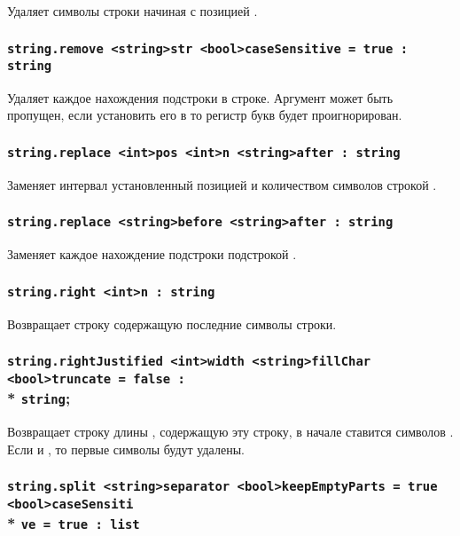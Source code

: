 Удаляет  символы строки начиная с позицией .

\subsubsection{\lstinline|string.remove <string>str <bool>caseSensitive = true : string|}

Удаляет каждое нахождения подстроки  в строке. Аргумент  может быть пропущен, если установить его в \false{} то регистр букв будет проигнорирован.

\subsubsection{\lstinline|string.replace <int>pos <int>n <string>after : string|}

Заменяет интервал установленный позицией  и количеством символов  строкой .

\subsubsection{\lstinline|string.replace <string>before <string>after : string|}

Заменяет каждое нахождение подстроки  подстрокой .

\subsubsection{\lstinline|string.right <int>n : string|}

Возвращает строку содержащую последние  символы строки.

\subsubsection{\lstinline|string.rightJustified <int>width <string>fillChar <bool>truncate = false :|\\* \lstinline|string|;}

Возвращает строку длины , содержащую эту строку, в начале ставится  символов . Если  и , то первые  символы будут удалены.

\subsubsection{\lstinline|string.split <string>separator <bool>keepEmptyParts = true <bool>caseSensiti|\\* \lstinline|ve = true : list|}

